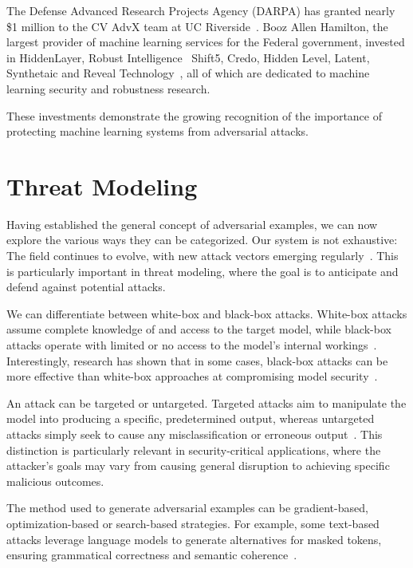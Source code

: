 \documentclass[a4paper, oneside]{discothesis}
\begin{document}
The Defense Advanced Research Projects Agency (DARPA) has granted nearly \$1 million to the CV AdvX team at UC Riverside~\cite{roy2020darpa}.
Booz Allen Hamilton, the largest provider of machine learning services for the Federal government, invested in HiddenLayer, Robust Intelligence~\cite{robustintelligence2024, cai2020robust} Shift5, Credo, Hidden Level, Latent, Synthetaic and Reveal Technology~\cite{boozallen2023adversarial, boozallen2023adversarialother}, all of which are dedicated to machine learning security and robustness research.

These investments demonstrate the growing recognition of the importance of protecting machine learning systems from adversarial attacks.

\section{Threat Modeling}

Having established the general concept of adversarial examples, we can now explore the various ways they can be categorized. Our system is not exhaustive: The field continues to evolve, with new attack vectors emerging regularly~\cite{Khaleel2024AdversarialAI}. This is particularly important in threat modeling, where the goal is to anticipate and defend against potential attacks.

We can differentiate between white-box and black-box attacks. White-box attacks assume complete knowledge of and access to the target model, while black-box attacks operate with limited or no access to the model's internal workings~\cite{capozzi2024adversarial}. Interestingly, research has shown that in some cases, black-box attacks can be more effective than white-box approaches at compromising model security~\cite{capozzi2024adversarial}.

An attack can be targeted or untargeted. Targeted attacks aim to manipulate the model into producing a specific, predetermined output, whereas untargeted attacks simply seek to cause any misclassification or erroneous output~\cite{capozzi2024adversarial, Kashyap2024AdversarialAA}. This distinction is particularly relevant in security-critical applications, where the attacker's goals may vary from causing general disruption to achieving specific malicious outcomes.

The method used to generate adversarial examples can be gradient-based, optimization-based or search-based strategies. For example, some text-based attacks leverage language models to generate alternatives for masked tokens, ensuring grammatical correctness and semantic coherence~\cite{garg2020bae}.
\end{document}
